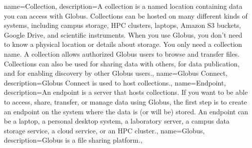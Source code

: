 { name={Collection},
  description={A collection is a named location containing data you can access with Globus. Collections can be hosted on many different kinds of systems, including campus storage, HPC clusters, laptops, Amazon S3 buckets, Google Drive, and scientific instruments. When you use Globus, you don’t need to know a physical location or details about storage. You only need a collection name. A collection allows authorized Globus users to browse and transfer files. Collections can also be used for sharing data with others, for data publication, and for enabling discovery by other Globus users.},
}
{ name={Globus Connect},
  description={Globus Connect is used to host collections.},
}
{ name={Endpoint},
  description={An endpoint is a server that hosts collections. If you want to be able to access, share, transfer, or manage data using Globus, the first step is to create an endpoint on the system where the data is (or will be) stored. An endpoint can be a laptop, a personal desktop system, a laboratory server, a campus data storage service, a cloud service, or an HPC cluster.},
}
{ name={Globus},
  description={Globus is a file sharing platform.},
}

